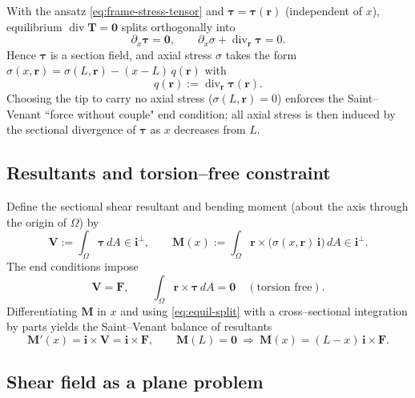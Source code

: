 
With the ansatz \eqref{eq:frame-stress-tensor} and $\bm{\tau}=\bm{\tau}(\bm{r})$ (independent of $x$), equilibrium $\operatorname{div}\bm{T}=\mathbf{0}$ splits orthogonally into
\begin{equation}
\partial_x\bm{\tau}=\mathbf{0},\qquad 
\partial_x\sigma+\operatorname{div}_{\bm{r}}\bm{\tau}=0.
\label{eq:equil-split}
\end{equation}
Hence $\bm{\tau}$ is a section field, and axial stress \(\sigma\) takes the form $\sigma(x,\bm{r})=\sigma(L,\bm{r})-(x-L)\,q(\bm{r})$ with
\begin{equation}
q(\bm{r}):=\operatorname{div}_{\bm{r}}\bm{\tau}(\bm{r}).
\label{eq:q-def}
\end{equation}
Choosing the tip to carry no axial stress ($\sigma(L,\bm{r})=0$) enforces the Saint–Venant ``force without couple" end condition; all axial stress is then induced by the sectional divergence of $\bm{\tau}$ as $x$ decreases from $L$.

\subsection*{Resultants and torsion–free constraint}

Define the sectional shear resultant and bending moment (about the axis through the origin of $\Omega$) by
\[
\bm{V}:=\int_\Omega \bm{\tau}\,dA\in\mathbf{i}^\perp,\qquad
\bm{M}(x):=\int_\Omega \bm{r}\times\big(\sigma(x,\bm{r})\,\mathbf{i}\big)\,dA\in\mathbf{i}^\perp.
\]
The end conditions impose
\begin{equation}
\bm{V}=\bm{F},\qquad 
\int_\Omega \bm{r}\times\bm{\tau}\,dA=\mathbf{0}\quad(\text{torsion free}).
\label{eq:resultants}
\end{equation}
Differentiating $\bm{M}$ in $x$ and using \eqref{eq:equil-split} with a cross–sectional integration by parts yields the Saint–Venant balance of resultants
\begin{equation}
\bm{M}'(x)=\mathbf{i}\times\bm{V}=\mathbf{i}\times\bm{F},\qquad \bm{M}(L)=\mathbf{0}\ \Rightarrow\ \bm{M}(x)=(L-x)\,\mathbf{i}\times\bm{F}.
\label{eq:moment-balance}
\end{equation}

\subsection*{Shear field as a plane problem}

